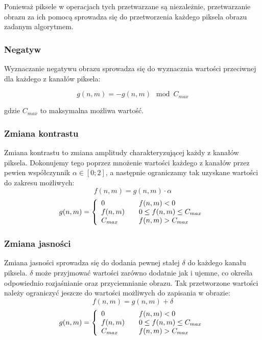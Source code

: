\documentclass{classrep}
\begin{document}
Ponieważ piksele w operacjach tych przetwarzane są niezależnie, przetwarzanie obrazu za ich pomocą sprowadza się do przetworzenia każdego piksela obrazu zadanym algorytmem.

\subsubsection{Negatyw}
Wyznaczanie negatywu obrazu sprowadza się do wyznacznia wartości przeciwnej dla każdego z kanałów piksela:

\begin{equation}
 g(n, m) = -g(n, m) \mod C_{max}
\end{equation}

gdzie $C_{max}$ to maksymalna możliwa wartość.

\subsubsection{Zmiana kontrastu}
Zmiana kontrastu to zmiana amplitudy charakteryzującej każdy z kanałów piksela. Dokonujemy tego poprzez mnożenie wartości każdego z kanałów przez pewien współczynnik $\alpha \in [0; 2]$, a następnie ograniczamy tak uzyskane wartości do zakresu możliwych:
\begin{equation}
 f(n, m) = g(n, m) \cdot \alpha
\end{equation}
\begin{equation}
 g(n, m) = \left\{
  \begin{array}{l l}
    0 & \quad f(n, m) < 0 \\
    f(n, m) & \quad 0 \leq f(n, m) \leq C_{max} \\
    C_{max} & \quad f(n, m) > C_{max} \\
  \end{array}
\right.
\end{equation}

\subsubsection{Zmiana jasności}
Zmiana jasności sprowadza się do dodania pewnej stałej $\delta$ do każdego kanału piksela. $\delta$ może przyjmować wartości zarówno dodatnie jak i ujemne, co określa odpowiednio rozjaśnianie oraz przyciemnianie obrazu. Tak przetworzone wartości należy ograniczyć jeszcze do wartości możliwych do zapisania w obrazie:
\begin{equation}
 f(n, m) = g(n, m) + \delta
\end{equation}
\begin{equation}
 g(n, m) = \left\{
  \begin{array}{l l}
    0 & \quad f(n, m) < 0 \\
    f(n, m) & \quad 0 \leq f(n, m) \leq C_{max} \\
    C_{max} & \quad f(n, m) > C_{max} \\
  \end{array}
\right.
\end{equation}
\end{document}
